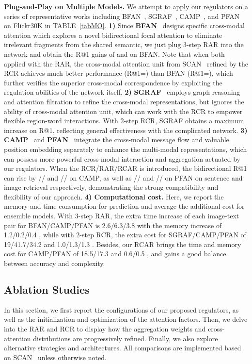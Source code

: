 \documentclass[journal]{IEEEtran}\newcommand{\ignore}[1]{}
\begin{document}
\textbf{Plug-and-Play on Multiple Models.} 
We attempt to apply our regulators on a series of representative works including BFAN~\cite{BFAN}, SGRAF~\cite{SGRAF}, CAMP~\cite{CAMP}, and PFAN~\cite{PFAN} on Flickr30K in TABLE~\ref{tabMO}.
\textbf{1)} Since \textbf{BFAN}~\cite{BFAN} designs specific cross-modal attention which explores a novel bidirectional focal attention to eliminate irrelevant fragments from the shared semantic, we just plug 3-step RAR into the network and obtain the R@1 gains of  and  on BFAN. Note that when both applied with the RAR, the cross-modal attention unit from SCAN~\cite{SCAN} refined by the RCR achieves much better performance (R@1=) than BFAN (R@1=), which further verifies the superior cross-modal correspondence by exploiting the regulation abilities of the network itself.
\textbf{2)} \textbf{SGRAF}~\cite{SGRAF} employs graph reasoning and attention filtration to refine the cross-modal representations, but ignores the ability of cross-modal attention unit, which can work with the RCR to empower flexible region-word interactions. With 2-step RCR, SGRAF obtains a maximum  increase on R@1, reflecting general effectiveness with the complicated network.
\textbf{3)} \textbf{CAMP}~\cite{CAMP} and \textbf{PFAN}~\cite{PFAN} integrate the cross-modal message flow and valuable position embedding separately to enhance the multi-modal representations, which can possess more powerful cross-modal interaction and aggregation actuated by our regulators. When the RCR/RAR/RCAR is introduced, the bidirectional R@1 can rise by // and // on CAMP, as well as // and // on PFAN on sentence and image retrieval respectively, demonstrating the strong compatibility and flexibility of our approach. 
\textbf{4) Computational cost.} Here, we report the memory and time consumption for prediction and average the additional cost for ensemble models. With 3-step RAR, the extra time increase of each image-text pair for BFAN/CAMP/PFAN is 2.6/6.3/3.8  with the memory increase of 1.2/0.2/0.4 , while with 2-step RCR, the extra cost for SGRAF/CAMP/PFAN of 19/41.7/34.2  and 1.0/1.3/1.3 . Besides, our RCAR brings the time and memory cost for CAMP/PFAN of 18.5/17.3  and 0.6/0.5 , and gains a good balance between accuracy and complexity.

\subsection{Ablation Studies}
\label{secAS}
In this section, we first report the configurations of our proposed regulators, as well as the initialization and optimization of the attention factors. Then, we delve into the RAR and RCR to display how the aggregation weights and cross-attention distributions are progressively refined. Finally, we also explore alternative strategies and architectures. All comparisons are implemented based on SCAN~\cite{SCAN} unless otherwise noted.
\end{document}
